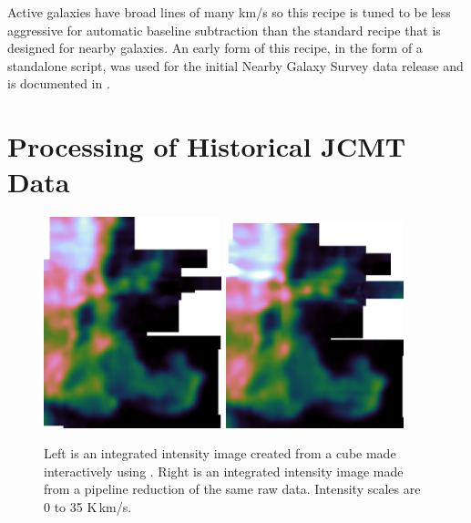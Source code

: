 \documentclass[final,authoryear,5p,times,twocolumn]{elsarticle}
\begin{document}
Active galaxies have broad lines of many km/s so this recipe is tuned
to be less aggressive for automatic baseline subtraction than the
standard recipe that is designed for nearby galaxies. An early
form of this recipe, in the form of a standalone script, was used for
the initial Nearby Galaxy Survey data release and is documented in
\citet{2010ApJ...714..571W}.

\section{Processing of Historical JCMT Data}

\begin{figure}[t]
\begin{minipage}{\textwidth}
\centering
\includegraphics[width=0.46\textwidth]{horsehead-specx}
\includegraphics[width=0.46\textwidth]{horsehead-pipeline}
\caption{Left is an integrated intensity image created from
  a cube made interactively using \specx. Right is an
  integrated intensity image made from a pipeline reduction of the
  same raw data. Intensity scales are 0 to 35 K\,km/s.}
\label{fig:hhcmp}
\end{minipage}
\end{figure}
\end{document}
